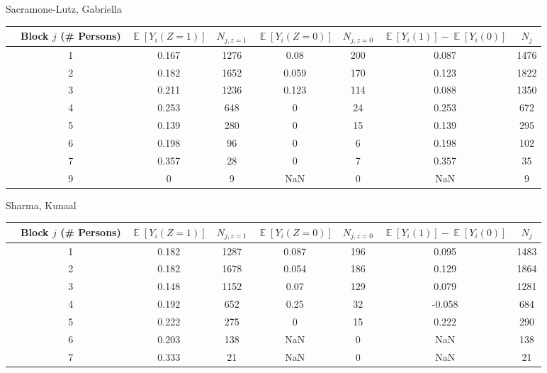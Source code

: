 \documentclass[11pt,notitlepage]{article}
\def\E{\mathop{\mathbb{E}}}
\begin{document}
Sacramone-Lutz, Gabriella


\begin{table}[h!]\small
\begin{center}
\begin{tabular}{rc|cc|cc|cc}
  \hline
 & Block $j$ (\# Persons) & $\E[Y_i(Z=1)]$ & $N_{j, z=1}$ & $\E[Y_i(Z=0)]$ & $N_{j, z=0}$ & $\E[Y_i(1)]-\E[Y_i(0)]$ & $N_j$ \\ 
  \hline
   & 1 & 0.167 & 1276 & 0.08 & 200 & 0.087 & 1476 \\ 
   & 2 & 0.182 & 1652 & 0.059 & 170 & 0.123 & 1822 \\ 
   & 3 & 0.211 & 1236 & 0.123 & 114 & 0.088 & 1350 \\ 
   & 4 & 0.253 & 648 & 0 & 24 & 0.253 & 672 \\ 
   & 5 & 0.139 & 280 & 0 & 15 & 0.139 & 295 \\ 
   & 6 & 0.198 & 96 & 0 & 6 & 0.198 & 102 \\ 
   & 7 & 0.357 & 28 & 0 & 7 & 0.357 & 35 \\ 
   & 9 & 0 & 9 & NaN & 0 & NaN & 9 \\ 
   \hline
\end{tabular}
\end{center}
\end{table}




Sharma, Kunaal


\begin{table}[h!]\small
\begin{center}
\begin{tabular}{rc|cc|cc|cc}
  \hline
 & Block $j$ (\# Persons) & $\E[Y_i(Z=1)]$ & $N_{j, z=1}$ & $\E[Y_i(Z=0)]$ & $N_{j, z=0}$ & $\E[Y_i(1)]-\E[Y_i(0)]$ & $N_j$ \\ 
  \hline
   & 1 & 0.182 & 1287 & 0.087 & 196 & 0.095 & 1483 \\ 
   & 2 & 0.182 & 1678 & 0.054 & 186 & 0.129 & 1864 \\ 
   & 3 & 0.148 & 1152 & 0.07 & 129 & 0.079 & 1281 \\ 
   & 4 & 0.192 & 652 & 0.25 & 32 & -0.058 & 684 \\ 
   & 5 & 0.222 & 275 & 0 & 15 & 0.222 & 290 \\ 
   & 6 & 0.203 & 138 & NaN & 0 & NaN & 138 \\ 
   & 7 & 0.333 & 21 & NaN & 0 & NaN & 21 \\ 
   \hline
\end{tabular}
\end{center}
\end{table}
\end{document}
